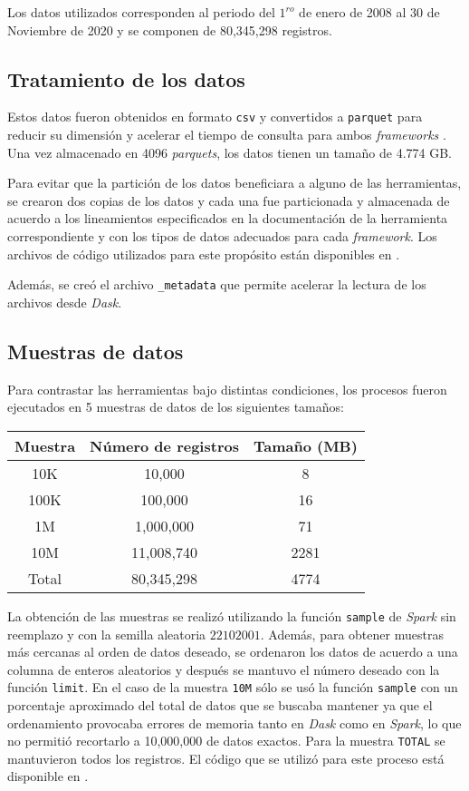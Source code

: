 Los datos utilizados corresponden al periodo del $1^{ro}$ de enero de 2008 al 30 de Noviembre de 2020 y se componen de 80,345,298 registros.

\subsection{Tratamiento de los datos}

Estos datos fueron obtenidos en formato \texttt{csv} y convertidos a \texttt{parquet} para reducir su dimensión y acelerar el tiempo de consulta para ambos \textit{frameworks} . Una vez almacenado en 4096 \textit{parquets}, los datos tienen un tamaño de 4.774 GB.

Para evitar que la partición de los datos beneficiara a alguno de las herramientas, se crearon dos copias de los datos y cada una fue particionada y almacenada de acuerdo a los lineamientos especificados en la documentación de la herramienta correspondiente y con los tipos de datos adecuados para cada \textit{framework}. Los archivos de código utilizados para este propósito están disponibles en \cite{tratamiento-datos}.

Además, se creó el archivo \texttt{\_metadata} que permite acelerar la lectura de los archivos desde \textit{Dask}.

\subsection{Muestras de datos}

Para contrastar las herramientas bajo distintas condiciones, los procesos fueron ejecutados en 5 muestras de datos de los siguientes tamaños:\\

\begin{center}
\begin{tabular}{|ccc|}
  \hline
 Muestra & Número de registros & Tamaño (MB) \\ 
  \hline
  10K & 10,000 & 8 \\ 
  100K & 100,000 & 16 \\ 
  1M & 1,000,000 & 71 \\ 
  10M & 11,008,740 & 2281 \\ 
  Total & 80,345,298 & 4774 \\ 
   \hline
\end{tabular}
\end{center}

La obtención de las muestras se realizó utilizando la función \texttt{sample} de \textit{Spark} sin reemplazo y con la semilla aleatoria $22102001$. Además, para obtener muestras más cercanas al orden de datos deseado, se ordenaron los datos de acuerdo a una columna de enteros aleatorios y después se mantuvo el número deseado con la función \texttt{limit}. En el caso de la muestra \texttt{10M} sólo se usó la función \texttt{sample} con un porcentaje aproximado del total de datos que se buscaba mantener ya que el ordenamiento provocaba errores de memoria tanto en \textit{Dask} como en \textit{Spark}, lo que no permitió recortarlo a 10,000,000 de datos exactos. Para la muestra \texttt{TOTAL} se mantuvieron todos los registros. El código que se utilizó para este proceso está disponible en \cite{proceso-muestreo}.